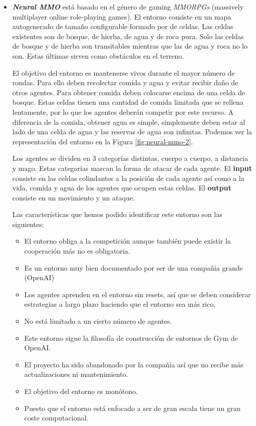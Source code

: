 \begin{itemize}
	\item \textbf{\textit{Neural MMO}} \cite{neural-mmo-repo} está basado en el género de gaming \textit{MMORPGs} (massively multiplayer online role-playing games). El entorno consiste en un mapa autogenerado de tamaño configurable formado por de celdas. Las celdas existentes son de bosque, de hierba, de agua y de roca pura. Solo las celdas de bosque y de hierba son transitables mientras que las de agua y roca no lo son. Estas últimas sirven como obstáculos en el terreno.  

	      El objetivo del entorno es mantenerse vivos durante el mayor número de rondas. Para ello deben recolectar comida y agua y evitar recibir daño de otros agentes. Para obtener comida deben colocarse encima de una celda de bosque. Estas celdas tienen una cantidad de comida limitada que se rellena lentamente, por lo que los agentes deberán competir por este recurso. A diferencia de la comida, obtener agua es simple, simplemente deben estar al lado de una celda de agua y las reservas de agua son infinitas. Podemos ver la representación del entorno en la Figura \ref {fig:neural-mmo-2}.  

	      Los agentes se dividen en 3 categorías distintas, cuerpo a cuerpo, a distancia y mago. Estas categorías marcan la forma de atacar de cada agente.
	      El \textbf{input} consiste en las celdas colindantes a la posición de cada agente así como a la vida, comida y agua de los agentes que ocupen estas celdas. El \textbf{output} consiste en un movimiento y un ataque. 

	      Las características que hemos podido identificar este entorno son las siguientes:
	      \begin{itemize}
		      \item El entorno obliga a la competición aunque también puede existir la cooperación más no es obligatoria.
		      \item Es un entorno muy bien documentado por ser de una compañía grande (OpenAI) \cite {openia}
		      \item Los agentes aprenden en el entorno sin resets, así que se deben considerar estrategias a largo plazo haciendo que el entorno sea más rico.
		      \item No está limitado a un cierto número de agentes.
		      \item Este entorno sigue la filosofía de construcción de entornos de Gym de OpenAI.
		      \item El proyecto ha sido abandonado por la compañía así que no recibe más actualizaciones ni mantenimiento.
		      \item El objetivo del entorno es monótono.
		      \item Puesto que el entorno está enfocado a ser de gran escala tiene un gran coste computacional.
	      \end{itemize}


\end{itemize}
